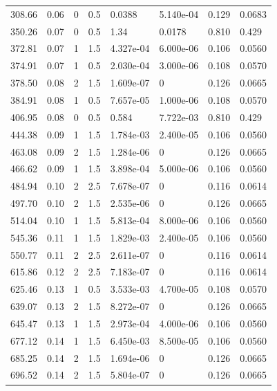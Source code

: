 \documentclass[preview]{standalone}
\begin{document}
{{\begin{tabular}{L{1.2cm}C{1.2cm} C{0.3cm}C{0.5cm} C{1.4cm}C{1.4cm} C{1.4cm}C{1.4cm}}
  308.66  &  0.06  & 0     & 0.5 &  0.0388  & 5.140e-04  & 0.129 &  0.0683   \\ 
  350.26  &  0.07  & 0     & 0.5 &  1.34  & 0.0178  & 0.810 &  0.429   \\ 
  372.81  &  0.07  & 1     & 1.5 &  4.327e-04  & 6.000e-06  & 0.106 &  0.0560   \\ 
  374.91  &  0.07  & 1     & 0.5 &  2.030e-04  & 3.000e-06  & 0.108 &  0.0570   \\ 
  378.50  &  0.08  & 2     & 1.5 &  1.609e-07  & 0  & 0.126 &  0.0665   \\ 
  384.91  &  0.08  & 1     & 0.5 &  7.657e-05  & 1.000e-06  & 0.108 &  0.0570   \\ 
  406.95  &  0.08  & 0     & 0.5 &  0.584  & 7.722e-03  & 0.810 &  0.429   \\ 
  444.38  &  0.09  & 1     & 1.5 &  1.784e-03  & 2.400e-05  & 0.106 &  0.0560   \\ 
  463.08  &  0.09  & 2     & 1.5 &  1.284e-06  & 0  & 0.126 &  0.0665   \\ 
  466.62  &  0.09  & 1     & 1.5 &  3.898e-04  & 5.000e-06  & 0.106 &  0.0560   \\ 
  484.94  &  0.10  & 2     & 2.5 &  7.678e-07  & 0  & 0.116 &  0.0614   \\ 
  497.70  &  0.10  & 2     & 1.5 &  2.535e-06  & 0  & 0.126 &  0.0665   \\ 
  514.04  &  0.10  & 1     & 1.5 &  5.813e-04  & 8.000e-06  & 0.106 &  0.0560   \\ 
  545.36  &  0.11  & 1     & 1.5 &  1.829e-03  & 2.400e-05  & 0.106 &  0.0560   \\ 
  550.77  &  0.11  & 2     & 2.5 &  2.611e-07  & 0  & 0.116 &  0.0614   \\ 
  615.86  &  0.12  & 2     & 2.5 &  7.183e-07  & 0  & 0.116 &  0.0614   \\ 
  625.46  &  0.13  & 1     & 0.5 &  3.533e-03  & 4.700e-05  & 0.108 &  0.0570   \\ 
  639.07  &  0.13  & 2     & 1.5 &  8.272e-07  & 0  & 0.126 &  0.0665   \\ 
  645.47  &  0.13  & 1     & 1.5 &  2.973e-04  & 4.000e-06  & 0.106 &  0.0560   \\ 
  677.12  &  0.14  & 1     & 1.5 &  6.450e-03  & 8.500e-05  & 0.106 &  0.0560   \\ 
  685.25  &  0.14  & 2     & 1.5 &  1.694e-06  & 0  & 0.126 &  0.0665   \\ 
  696.52  &  0.14  & 2     & 1.5 &  5.804e-07  & 0  & 0.126 &  0.0665   \\ 

\end{tabular}}}
\end{document}
